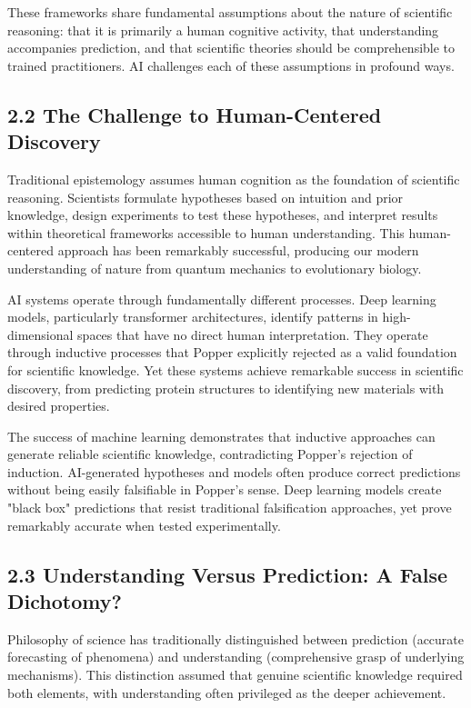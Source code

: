\documentclass{article}
\begin{document}
These frameworks share fundamental assumptions about the nature of scientific reasoning: that it is primarily a human cognitive activity, that understanding accompanies prediction, and that scientific theories should be comprehensible to trained practitioners. AI challenges each of these assumptions in profound ways.


\subsection{2.2 The Challenge to Human-Centered Discovery}

Traditional epistemology assumes human cognition as the foundation of scientific reasoning. Scientists formulate hypotheses based on intuition and prior knowledge, design experiments to test these hypotheses, and interpret results within theoretical frameworks accessible to human understanding. This human-centered approach has been remarkably successful, producing our modern understanding of nature from quantum mechanics to evolutionary biology.


AI systems operate through fundamentally different processes. Deep learning models, particularly transformer architectures, identify patterns in high-dimensional spaces that have no direct human interpretation. They operate through inductive processes that Popper explicitly rejected as a valid foundation for scientific knowledge. Yet these systems achieve remarkable success in scientific discovery, from predicting protein structures to identifying new materials with desired properties.


The success of machine learning demonstrates that inductive approaches can generate reliable scientific knowledge, contradicting Popper's rejection of induction. AI-generated hypotheses and models often produce correct predictions without being easily falsifiable in Popper's sense. Deep learning models create "black box" predictions that resist traditional falsification approaches, yet prove remarkably accurate when tested experimentally.


\subsection{2.3 Understanding Versus Prediction: A False Dichotomy?}

Philosophy of science has traditionally distinguished between prediction (accurate forecasting of phenomena) and understanding (comprehensive grasp of underlying mechanisms). This distinction assumed that genuine scientific knowledge required both elements, with understanding often privileged as the deeper achievement.
\end{document}
